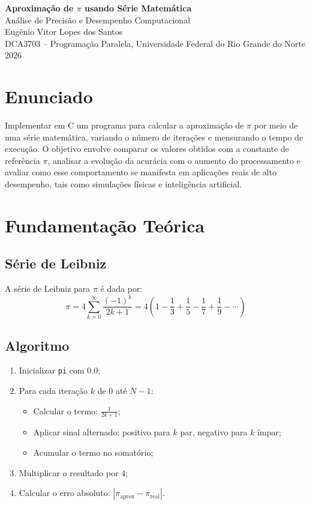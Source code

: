 \documentclass[11pt,letterpaper]{article}
\begin{document}
\pagestyle{plain}

\begin{center}
    {\LARGE\bfseries Aproximação de $\pi$ usando Série Matemática}\\[0.5em]
    {\large Análise de Precisão e Desempenho Computacional}\\[1em]
    {\normalsize Eugênio Vitor Lopes dos Santos}\\[0.3em]
    {\small DCA3703 -- Programação Paralela, Universidade Federal do Rio Grande do Norte}\\[0.3em]
    {\small 2026}
\end{center}

\vspace{1em}

\section{Enunciado}

Implementar em C um programa para calcular a aproximação de $\pi$ por meio de uma série matemática, variando o número de iterações e mensurando o tempo de execução. O objetivo envolve comparar os valores obtidos com a constante de referência $\pi$, analisar a evolução da acurácia com o aumento do processamento e avaliar como esse comportamento se manifesta em aplicações reais de alto desempenho, tais como simulações físicas e inteligência artificial.

\section{Fundamentação Teórica}

\subsection{Série de Leibniz}
A série de Leibniz para $\pi$ é dada por:
\[
\pi = 4 \sum_{k=0}^{\infty} \frac{(-1)^k}{2k+1} = 4 \left(1 - \frac{1}{3} + \frac{1}{5} - \frac{1}{7} + \frac{1}{9} - \cdots\right)
\]


\subsection{Algoritmo}
\begin{enumerate}
    \item Inicializar \texttt{pi} com 0.0;
    \item Para cada iteração $k$ de 0 até $N-1$:
    \begin{itemize}
        \item Calcular o termo: $\frac{1}{2k+1}$;
        \item Aplicar sinal alternado: positivo para $k$ par, negativo para $k$ ímpar;
        \item Acumular o termo no somatório;
    \end{itemize}
    \item Multiplicar o resultado por 4;
    \item Calcular o erro absoluto: $|\pi_{\text{aprox}} - \pi_{\text{real}}|$.
\end{enumerate}
\end{document}
